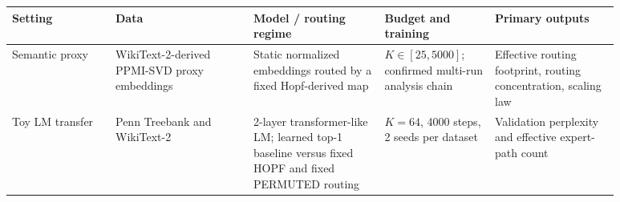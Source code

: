 \begin{tabular}{p{0.15\linewidth}p{0.20\linewidth}p{0.19\linewidth}p{0.16\linewidth}p{0.18\linewidth}}
\toprule
Setting & Data & Model / routing regime & Budget and training & Primary outputs \\
\midrule
Semantic proxy & WikiText-2-derived PPMI-SVD proxy embeddings & Static normalized embeddings routed by a fixed Hopf-derived map & $K \in [25, 5000]$; confirmed multi-run analysis chain & Effective routing footprint, routing concentration, scaling law \\
Toy LM transfer & Penn Treebank and WikiText-2 & 2-layer transformer-like LM; learned top-1 baseline versus fixed HOPF and fixed PERMUTED routing & $K = 64$, 4000 steps, 2 seeds per dataset & Validation perplexity and effective expert-path count \\
\bottomrule
\end{tabular}
